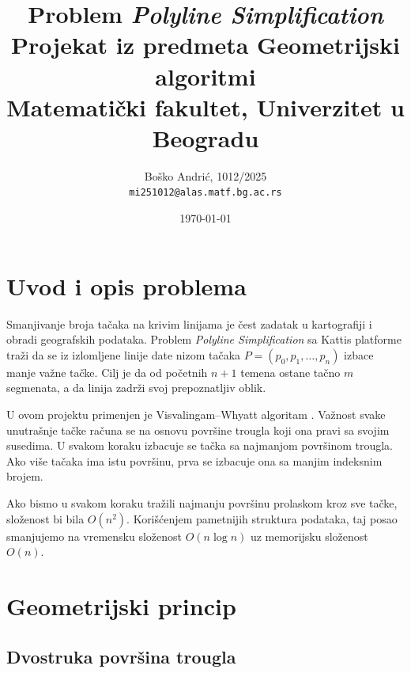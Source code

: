 \documentclass[11pt]{article}
\theoremstyle{definition}
\begin{document}
\sloppy

\title{\vspace{-1.5cm}Problem \emph{Polyline Simplification}
\\[0.2cm]
\small{Projekat iz predmeta Geometrijski algoritmi\\ Matematički fakultet, Univerzitet u Beogradu}}
\author{Boško Andrić, 1012/2025\\ \texttt{mi251012@alas.matf.bg.ac.rs}}
\date{\today}
\maketitle

\vspace{-0.5cm}
\tableofcontents
\vspace{0.3cm}

\section{Uvod i opis problema}

Smanjivanje broja tačaka na krivim linijama je čest zadatak u kartografiji i obradi geografskih podataka. Problem \emph{Polyline Simplification} sa Kattis platforme \cite{kattis} traži da se iz izlomljene linije date nizom tačaka $P = (p_0, p_1, \ldots, p_n)$ izbace manje važne tačke. Cilj je da od početnih $n+1$ temena ostane tačno $m$ segmenata, a da linija zadrži svoj prepoznatljiv oblik.

U ovom projektu primenjen je Visvalingam--Whyatt algoritam \cite{visvalingam1993}. Važnost svake unutrašnje tačke računa se na osnovu površine trougla koji ona pravi sa svojim susedima. U svakom koraku izbacuje se tačka sa najmanjom površinom trougla. Ako više tačaka ima istu površinu, prva se izbacuje ona sa manjim indeksnim brojem.

Ako bismo u svakom koraku tražili najmanju površinu prolaskom kroz sve tačke, složenost bi bila $O(n^2)$. Korišćenjem pametnijih struktura podataka, taj posao smanjujemo na vremensku složenost $O(n \log n)$ uz memorijsku složenost $O(n)$.

\section{Geometrijski princip}

\subsection{Dvostruka površina trougla}
\end{document}
